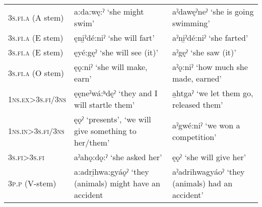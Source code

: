 \begin{table}
\begin{tabularx}{\textwidth}{QQQ}
\midrule
\tablevspace
{} \newline \textsc{3s.fi.a} (A stem) & a:da:wę:ˀ \newline ‘she might swim’ & aˀdawęˀneˀ \newline ‘she is going swimming’\\
{} \newline \textsc{3s.fi.a} (E stem) & ęni̱ˀdé:niˀ \newline ‘she will fart’ & aˀni̱ˀdé:niˀ \newline ‘she farted’\\
\tablevspace
{} \newline \textsc{3s.fi.a} (E stem) & ęyé:gęˀ \newline ‘she will see (it)’ & aˀgęˀ \newline ‘she saw (it)’\\
\tablevspace
{} \newline \textsc{3s.fi.a} (O stem) & ęǫ:niˀ \newline ‘she will make, earn’ & aˀǫ:niˀ \newline ‘how much she made, earned’\\
\tablevspace
{} \newline \textsc{1ns.ex>3s.fi/3ns} & ęęneˀwá:ʰdęˀ \newline ‘they and I will startle them’ & a̱htgaˀ \newline ‘we let them go, released them’\\
\tablevspace
{} \newline \textsc{1ns.in>3s.fi/3ns} & ęǫˀ \newline ‘presents’, \newline ‘we will give something to her/them’ & aˀgwé:niˀ \newline ‘we won a competition’\\
\tablevspace
{} \newline \textsc{3s.fi>3s.fi} & aˀahǫ:dǫ:ˀ \newline ‘she asked her’ & ęǫˀ \newline ‘she will give her’\\
\tablevspace
{} \newline \textsc{3p.p} (V-stem) & a:adri̱hwa:gyáǫˀ \newline ‘they (animals) might have an accident & aˀadrihwagyáoˀ \newline ‘they (animals) had an accident’\\

\end{tabularx}
\end{table}
